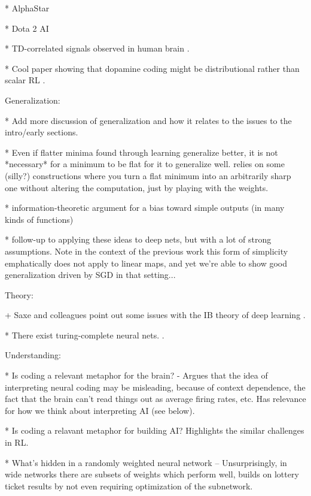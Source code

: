 * AlphaStar \citep{Vinyals2019}

* Dota 2 AI \citep{OpenAI2019}

* TD-correlated signals observed in human brain \citep{ODoherty2003}.

* Cool paper showing that dopamine coding might be distributional rather than scalar RL \citep{Dabney2020}.


Generalization:

* Add more discussion of generalization and how it relates to the issues to the intro/early sections.

* Even if flatter minima found through learning generalize better, it is not *necessary* for a minimum to be flat for it to generalize well. relies on some (silly?) constructions where you turn a flat minimum into an arbitrarily sharp one without altering the computation, just by playing with the weights. \citep{Dinh2017} 

* information-theoretic argument for a bias toward simple outputs (in many kinds of functions) \citep{Dingle2018}

* follow-up to \citep{Dingle2018} applying these ideas to deep nets, but with a lot of strong assumptions. \citep{Perez2019} Note in the context of the previous work this form of simplicity emphatically does not apply to linear maps, and yet we're able to show good generalization driven by SGD in that setting...  


Theory:

+ Saxe and colleagues point out some issues with the IB theory of deep learning \citep{Saxe2018a}.

* There exist turing-complete neural nets. \citep{Siegelman1992}.


Understanding:

* Is coding a relevant metaphor for the brain? - Argues that the idea of interpreting neural coding may be misleading, because of context dependence, the fact that the brain can't read things out as average firing rates, etc. Has relevance for how we think about interpreting AI (see below). \citep{Brette2019} 

* Is coding a relavant metaphor for building AI? Highlights the similar challenges in RL. \citep{Santoro2019}

* What's hidden in a randomly weighted neural network -- Unsurprisingly, in wide networks there are subsets of weights which perform well, builds on lottery ticket results by not even requiring optimization of the subnetwork. \citep{Ramanujan2019}

